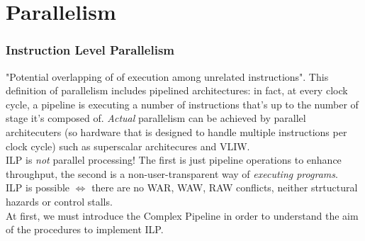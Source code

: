 \documentclass[10pt,a4paper]{article}
\begin{document}
	\part{Parallelism}
		\section{Instruction Level Parallelism}
			"Potential overlapping of of execution among unrelated instructions". This definition of parallelism includes pipelined architectures: in fact, at every clock cycle, a pipeline is executing a number of instructions that's up to the number of stage it's composed of. \emph{Actual} parallelism can be achieved by parallel architecuters (so hardware that is designed to handle multiple instructions per clock cycle) such as superscalar architecures and VLIW.\\
			ILP is \emph{not} parallel processing! The first is just pipeline operations to enhance throughput, the second is a non-user-transparent way of \emph{executing programs}.\\
			ILP is possible $\Leftrightarrow$ there are no WAR, WAW, RAW conflicts, neither strtuctural hazards or control stalls.\\
			At first, we must introduce the Complex Pipeline in order to understand the aim of the procedures to implement ILP. 
			
\end{document}
